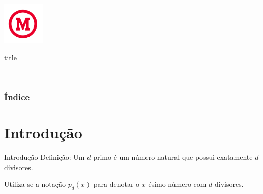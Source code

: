 \documentclass[12pt,
aspectratio=169,
]{beamer}
\begin{document}
\begin{titleframe}
	\begin{center}
		\includegraphics[width=2cm]{images/M_vermelho.pdf}\\[0.2cm]
		\begin{beamercolorbox}[sep=5pt,center]{title}
			\insertsectionhead\par
			\inserttitle\par\insertsubtitle
		\end{beamercolorbox}
	\end{center}
	\insertsectionhead\par
		\large \bf\insertauthor\\
	\vfill
	\begin{center}\large \bf\insertdate\end{center}
\end{titleframe}

\begin{frame}
\frametitle{\'Indice}
\tableofcontents
\end{frame}

\section{Introdução}

\begin{frame}{Introdução}
Defini\c c\~ao: Um $d$-primo \'e um n\'umero natural que possui exatamente $d$ divisores.

Utiliza-se a nota\c c\~ao $p_d(x)$ para denotar o $x$-\'esimo n\'umero com $d$ divisores.

\end{frame}
\end{document}
